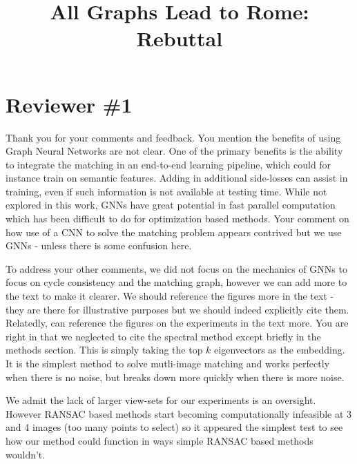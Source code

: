 \documentclass[10pt,twocolumn,letterpaper]{article}
\begin{document}
\title{All Graphs Lead to Rome: Rebuttal}  %

\maketitle
\thispagestyle{empty}


\section{Reviewer \#1}
Thank you for your comments and feedback. You
mention the benefits of using Graph Neural Networks are not clear. One
of the primary benefits is the ability to integrate the matching in an
end-to-end learning pipeline, which could for instance train on semantic
features. Adding in additional side-losses can assist in training,
even if such information is not available at testing time. While not
explored in this work, GNNs have great potential in fast parallel
computation which has been difficult to do for optimization based
methods. Your comment on how use of a CNN to solve the matching
problem appears contrived but we use GNNs - unless there is some
confusion here.

To address your other comments, we did not focus on the mechanics of
GNNs to focus on cycle consistency and the matching graph, however we
can add more to the text to make it clearer. We should reference the
figures more in the text - they are there for illustrative purposes but
we should indeed explicitly cite them. Relatedly, can reference the
figures on the experiments in the text more.
You are right in that we neglected to cite the spectral method
\cite{pachauri2013solving} except briefly in the methods section. This
is simply taking the top $k$ eigenvectors as the embedding. It is the
simplest method to solve mutli-image matching and works perfectly when
there is no noise, but breaks down more quickly when there is more noise.

We admit the lack of larger view-sets for our experiments is an
oversight. However RANSAC based methods start becoming computationally
infeasible at 3 and 4 images (too many points to select) so it appeared
the simplest test to see how our method could function in ways simple
RANSAC based methods wouldn't.
\end{document}
